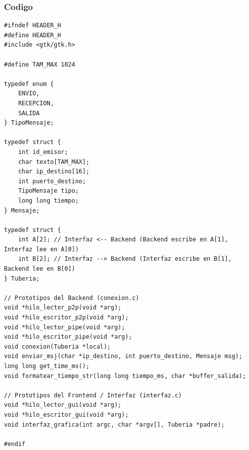 \subsubsection{\large Codigo}
\begin{lstlisting}[style=estiloC, caption={Archivo de declaraciones compartidas entre el Backend y el Frontend}]
#ifndef HEADER_H
#define HEADER_H
#include <gtk/gtk.h>

#define TAM_MAX 1024

typedef enum {
    ENVIO,
    RECEPCION,
    SALIDA
} TipoMensaje;

typedef struct {
    int id_emisor;          
    char texto[TAM_MAX];        
    char ip_destino[16];     
    int puerto_destino;      
    TipoMensaje tipo;
    long long tiempo;         
} Mensaje;

typedef struct {
    int A[2]; // Interfaz <-- Backend (Backend escribe en A[1], Interfaz lee en A[0])
    int B[2]; // Interfaz --> Backend (Interfaz escribe en B[1], Backend lee en B[0])
} Tuberia;

// Prototipos del Backend (conexion.c)
void *hilo_lector_p2p(void *arg);
void *hilo_escritor_p2p(void *arg);
void *hilo_lector_pipe(void *arg);
void *hilo_escritor_pipe(void *arg);
void conexion(Tuberia *local);
void enviar_msj(char *ip_destino, int puerto_destino, Mensaje msg);
long long get_time_ms();
void formatear_tiempo_str(long long tiempo_ms, char *buffer_salida);

// Prototipos del Frontend / Interfaz (interfaz.c)
void *hilo_lector_gui(void *arg);
void *hilo_escritor_gui(void *arg);
void interfaz_grafica(int argc, char *argv[], Tuberia *padre);

#endif
\end{lstlisting}
